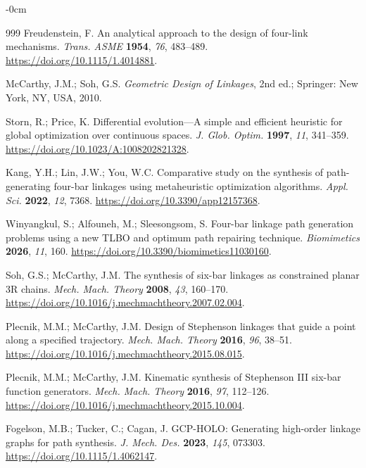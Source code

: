 \documentclass[applsci,article,submit,pdftex,moreauthors]{Definitions/mdpi}
\begin{document}
\begin{adjustwidth}{-\extralength}{0cm}

\begin{thebibliography}{999}
Freudenstein, F. An analytical approach to the design of four-link
mechanisms. \textit{Trans. ASME} \textbf{1954}, \textit{76},
483--489. \url{https://doi.org/10.1115/1.4014881}.

McCarthy, J.M.; Soh, G.S. \textit{Geometric Design of Linkages}, 2nd
ed.; Springer: New York, NY, USA, 2010.

Storn, R.; Price, K. Differential evolution---A simple and efficient
heuristic for global optimization over continuous spaces. \textit{J.
Glob. Optim.} \textbf{1997}, \textit{11}, 341--359.
\url{https://doi.org/10.1023/A:1008202821328}.

Kang, Y.H.; Lin, J.W.; You, W.C. Comparative study on the synthesis
of path-generating four-bar linkages using metaheuristic optimization
algorithms. \textit{Appl. Sci.} \textbf{2022}, \textit{12}, 7368.
\url{https://doi.org/10.3390/app12157368}.

Winyangkul, S.; Alfouneh, M.; Sleesongsom, S. Four-bar linkage path
generation problems using a new TLBO and optimum path repairing
technique. \textit{Biomimetics} \textbf{2026}, \textit{11}, 160.
\url{https://doi.org/10.3390/biomimetics11030160}.

Soh, G.S.; McCarthy, J.M. The synthesis of six-bar linkages as
constrained planar 3R chains. \textit{Mech. Mach. Theory}
\textbf{2008}, \textit{43}, 160--170.
\url{https://doi.org/10.1016/j.mechmachtheory.2007.02.004}.

Plecnik, M.M.; McCarthy, J.M. Design of Stephenson linkages that
guide a point along a specified trajectory. \textit{Mech. Mach.
Theory} \textbf{2016}, \textit{96}, 38--51.
\url{https://doi.org/10.1016/j.mechmachtheory.2015.08.015}.

Plecnik, M.M.; McCarthy, J.M. Kinematic synthesis of Stephenson III
six-bar function generators. \textit{Mech. Mach. Theory}
\textbf{2016}, \textit{97}, 112--126.
\url{https://doi.org/10.1016/j.mechmachtheory.2015.10.004}.

Fogelson, M.B.; Tucker, C.; Cagan, J. GCP-HOLO: Generating high-order
linkage graphs for path synthesis. \textit{J. Mech. Des.}
\textbf{2023}, \textit{145}, 073303.
\url{https://doi.org/10.1115/1.4062147}.


\end{thebibliography}
\end{adjustwidth}
\end{document}
